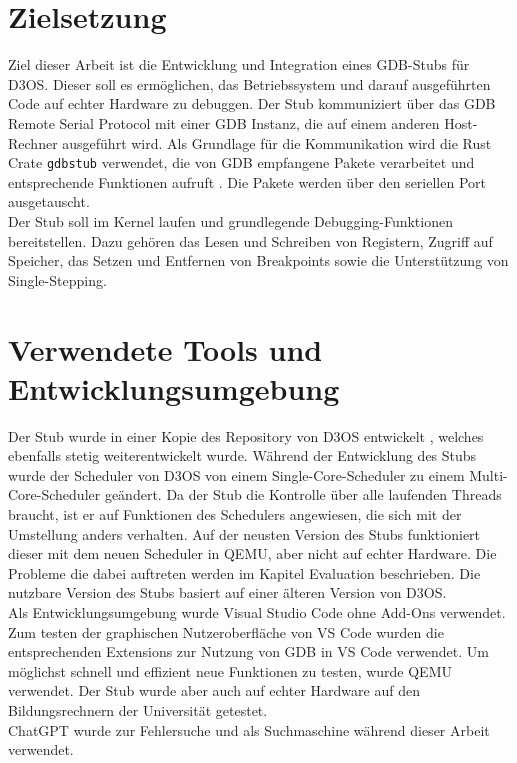 \section{Zielsetzung}
Ziel dieser Arbeit ist die Entwicklung und Integration eines GDB-Stubs für D3OS. Dieser soll es ermöglichen, das Betriebssystem und darauf ausgeführten Code auf echter Hardware zu debuggen. Der Stub kommuniziert über das GDB Remote Serial Protocol mit einer GDB Instanz, die auf einem anderen Host-Rechner ausgeführt wird. Als Grundlage für die Kommunikation wird die Rust Crate \texttt{gdbstub} verwendet, die von GDB empfangene Pakete verarbeitet und entsprechende Funktionen aufruft \cite{gdbstub}. Die Pakete werden über den seriellen Port ausgetauscht.\\
Der Stub soll im Kernel laufen und grundlegende Debugging-Funktionen bereitstellen. Dazu gehören das Lesen und Schreiben von Registern, Zugriff auf Speicher, das Setzen und Entfernen von Breakpoints sowie die Unterstützung von Single-Stepping. 

\section{Verwendete Tools und Entwicklungsumgebung}
Der Stub wurde in einer Kopie des Repository von D3OS entwickelt \cite{d3os-repo}, welches ebenfalls stetig weiterentwickelt wurde. Während der Entwicklung des Stubs wurde der Scheduler von D3OS von einem Single-Core-Scheduler zu einem Multi-Core-Scheduler geändert. Da der Stub die Kontrolle über alle laufenden Threads braucht, ist er auf Funktionen des Schedulers angewiesen, die sich mit der Umstellung anders verhalten. Auf der neusten Version des Stubs funktioniert dieser mit dem neuen Scheduler in QEMU, aber nicht auf echter Hardware. Die Probleme die dabei auftreten werden im Kapitel Evaluation beschrieben. Die nutzbare Version des Stubs basiert auf einer älteren Version von D3OS.\\
Als Entwicklungsumgebung wurde Visual Studio Code \cite{vscode} ohne Add-Ons verwendet. Zum testen der graphischen Nutzeroberfläche von VS Code wurden die entsprechenden Extensions zur Nutzung von GDB in VS Code verwendet. Um möglichst schnell und effizient neue Funktionen zu testen, wurde QEMU verwendet. Der Stub wurde aber auch auf echter Hardware auf den Bildungsrechnern der Universität getestet.\\
ChatGPT \cite{chatgpt} wurde zur Fehlersuche und als Suchmaschine während dieser Arbeit verwendet.